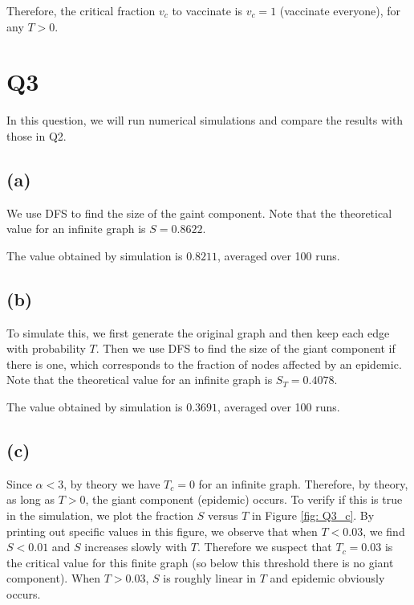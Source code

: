 \documentclass{article}
\begin{document}
Therefore, the critical fraction $ v_c $ to vaccinate is $ v_c = 1 $ (vaccinate everyone), for any $ T>0 $.

\section*{Q3}
In this question, we will run numerical simulations and compare the results with those in Q2. 

\subsection*{(a)}
We use DFS to find the size of the gaint component. Note that the theoretical value for an infinite graph is $ S = 0.8622 $.

The value obtained by simulation is $ 0.8211 $, averaged over 100 runs.

\subsection*{(b)} 
To simulate this, we first generate the original graph and then keep each edge with probability $ T $. Then we use DFS to find the size of the giant component if there is one, which corresponds to the fraction of nodes affected by an epidemic. Note that the theoretical value for an infinite graph is $ S_T = 0.4078 $.

The value obtained by simulation is $ 0.3691 $, averaged over 100 runs.

\subsection*{(c)}
Since $ \alpha < 3 $, by theory we have $ T_c =0 $ for an infinite graph. Therefore, by theory, as long as $ T>0 $, the giant component (epidemic) occurs. To verify if this is true in the simulation, we plot the fraction $ S $ versus $ T $ in Figure \ref{fig: Q3_c}. By printing out specific values in this figure, we observe that when $ T<0.03 $, we find $ S<0.01 $ and $ S $ increases slowly with $ T $. Therefore we suspect that $ T_c = 0.03 $ is the critical value for this finite graph (so below this threshold there is no giant component). When $ T>0.03 $, $ S $ is roughly linear in $ T $ and epidemic obviously occurs.
\end{document}
